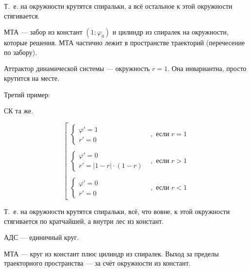 Т.~е. на окружности крутятся спиральки, а всё остальное к этой окружности стягивается.

МТА --- забор из констант $(1;\varphi_0)$ и цилиндр из спиралек на окружности, которые решения.
МТА частично лежит в пространстве траекторий
(перечесение по забору).

Аттрактор динамической системы --- окружность $r = 1$.
Она инвариантна, просто крутится на месте.

Третий пример:

СК та же.


\begin{equation}
	\left\lbrack
		\begin{array}{ll}
			\left\{
				\begin{array}{l}
					\varphi ' = 1
				\\
					r' = 0
				\end{array}
			\right.
			& , \mbox{~если~} r = 1
			\\\\
			\left\{
				\begin{array}{l}
					\varphi ' = 0
				\\
					r' = |1-r| \cdot (1-r)
				\end{array}
			\right.
			& , \mbox{~если~} r > 1
			\\\\
			\left\{
				\begin{array}{l}
					\varphi ' = 0
				\\
					r' = 0
				\end{array}
			\right.
			& , \mbox{~если~} r < 1
		\end{array}
	\right.
\end{equation}

Т.~е. на окружности крутятся спиральки,
всё, что вовне, к этой окружности стягивается по кратчайшей,
а внутри лес из констант.

АДС --- единичный круг.

МТА --- круг из констант плюс цилиндр из спиралек.
Выход за пределы траекторного пространства --- за счёт окружности из констант.


